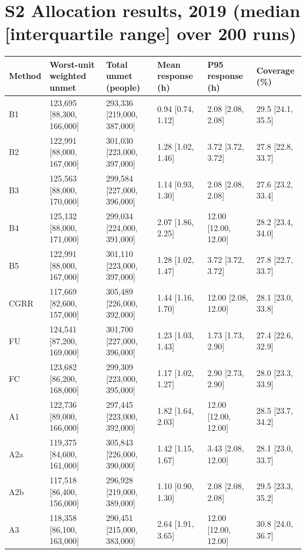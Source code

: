 \documentclass[10pt]{article}
\begin{document}
\section*{S2 Allocation results, 2019 (median [interquartile range] over 200 runs)}\small\begin{tabular}{llllll}\toprule Method & Worst-unit weighted unmet & Total unmet (people) & Mean response (h) & P95 response (h) & Coverage (\%)\\\midrule
B1 & 123,695 [88,300, 166,000] & 293,336 [219,000, 387,000] & 0.94 [0.74, 1.12] & 2.08 [2.08, 2.08] & 29.5 [24.1, 35.5]\\
B2 & 122,991 [88,000, 167,000] & 301,030 [223,000, 397,000] & 1.28 [1.02, 1.46] & 3.72 [3.72, 3.72] & 27.8 [22.8, 33.7]\\
B3 & 125,563 [88,000, 170,000] & 299,584 [227,000, 396,000] & 1.14 [0.93, 1.30] & 2.08 [2.08, 2.08] & 27.6 [23.2, 33.4]\\
B4 & 125,132 [88,000, 171,000] & 299,034 [224,000, 391,000] & 2.07 [1.86, 2.25] & 12.00 [12.00, 12.00] & 28.2 [23.4, 34.0]\\
B5 & 122,991 [88,000, 167,000] & 301,110 [223,000, 397,000] & 1.28 [1.02, 1.47] & 3.72 [3.72, 3.72] & 27.8 [22.7, 33.7]\\
CGRR & 117,669 [82,600, 157,000] & 305,489 [226,000, 392,000] & 1.44 [1.16, 1.70] & 12.00 [2.08, 12.00] & 28.1 [23.0, 33.8]\\
FU & 124,541 [87,200, 169,000] & 301,700 [227,000, 396,000] & 1.23 [1.03, 1.43] & 1.73 [1.73, 2.90] & 27.4 [22.6, 32.9]\\
FC & 123,682 [86,200, 168,000] & 299,309 [223,000, 395,000] & 1.17 [1.02, 1.27] & 2.90 [2.73, 2.90] & 28.0 [23.3, 33.9]\\
A1 & 122,736 [89,000, 166,000] & 297,445 [223,000, 392,000] & 1.82 [1.64, 2.03] & 12.00 [12.00, 12.00] & 28.5 [23.7, 34.2]\\
A2a & 119,375 [84,600, 161,000] & 305,843 [226,000, 390,000] & 1.42 [1.15, 1.67] & 3.43 [2.08, 12.00] & 28.1 [23.0, 33.7]\\
A2b & 117,518 [86,400, 156,000] & 296,928 [219,000, 389,000] & 1.10 [0.90, 1.30] & 2.08 [2.08, 2.08] & 29.5 [23.3, 35.2]\\
A3 & 118,358 [86,100, 163,000] & 290,451 [215,000, 383,000] & 2.64 [1.91, 3.65] & 12.00 [12.00, 12.00] & 30.8 [24.0, 36.7]\\
\bottomrule\end{tabular}
\end{document}
